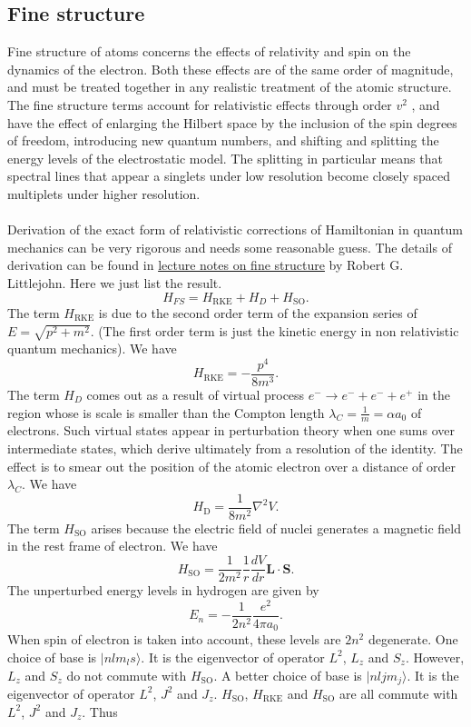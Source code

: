 \subsection{Fine structure}
Fine structure of atoms concerns the effects of relativity and spin on the dynamics of the electron. Both these effects are of the same order of magnitude, and must be treated together in any realistic treatment of the atomic structure.
The fine structure terms account for relativistic effects through order $v^2$ , and have the effect of enlarging the Hilbert space by the inclusion of the spin degrees of freedom, introducing new quantum numbers, and shifting and splitting the energy levels of the electrostatic model. 
The splitting in particular means that spectral lines that appear a singlets under low resolution become closely spaced multiplets under higher resolution.
\\ \\
Derivation of the exact form of relativistic corrections of Hamiltonian in quantum mechanics can be very rigorous and needs some reasonable guess. The details of derivation can be found in 
\href{http://bohr.physics.berkeley.edu/classes/221/1112/notes/finestruc.pdf}{lecture notes on fine structure} by Robert G. Littlejohn. Here we just list the result.
\[H_{FS} = H_{\mathrm{RKE}} + H_{D} + H_{\mathrm{SO}}.\]
The term $H_{\mathrm{RKE}}$ is due to the second order term of the expansion series of $E = \sqrt{p^2+m^2}$. (The first order term is just the kinetic energy in non relativistic quantum mechanics). We have
\[H_{\mathrm{RKE}} = - \frac{p^4}{8m^3}.\]
The term $H_{D}$ comes out as a result of virtual process $e^{-} \to e^{-} + e^{-} + e^{+}$ in the region whose is scale is smaller than the Compton length $\lambda_C = \frac{1}{m} = \alpha a_0$ of electrons. Such virtual states appear in perturbation theory when one sums over intermediate states, which derive ultimately from a resolution of the identity. The effect is to smear out the position of the atomic electron
over a distance of order $\lambda_C$. We have
\[H_{\mathrm{D}} = \frac{1}{8m^2} \nabla^2 V.\]
The term $H_{\mathrm{SO}}$ arises because the electric field of nuclei generates a magnetic field in the rest frame of electron. We have
\[H_{\mathrm{SO}} = \frac{1}{2m^2} \frac{1}{r} \frac{dV}{dr} \bm{L}\cdot\bm{S}.\]
The unperturbed energy levels in hydrogen are given by
\[E_n = -\frac{1}{2n^2} \frac{e^2}{4\pi a_0}.\]
When spin of electron is taken into account,  these levels are $2n^2$ degenerate. One choice of base is $|nlm_{l}s\rangle$. It is the eigenvector of operator $L^2$, $L_z$ and $S_z$. However, $L_z$ and $S_z$ do not commute with $H_{\mathrm{SO}}$. A better choice of base is $|nljm_j\rangle$. It is the eigenvector of operator $L^2$, $J^2$ and $J_z$. $H_{\mathrm{SO}}$, $H_{\mathrm{RKE}}$ and $H_{\mathrm{SO}}$ are all commute with $L^2$, $J^2$ and $J_z$. Thus
